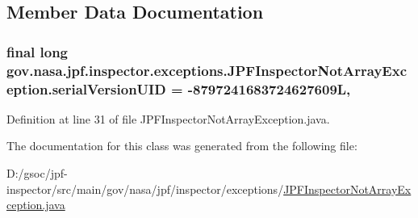 \subsection{Member Data Documentation}
\subsubsection[{\texorpdfstring{serial\+Version\+U\+ID}{serialVersionUID}}]{\setlength{\rightskip}{0pt plus 5cm}final long gov.\+nasa.\+jpf.\+inspector.\+exceptions.\+J\+P\+F\+Inspector\+Not\+Array\+Exception.\+serial\+Version\+U\+ID = -\/8797241683724627609L\hspace{0.3cm}{\ttfamily [static]}, {\ttfamily [private]}}\hypertarget{classgov_1_1nasa_1_1jpf_1_1inspector_1_1exceptions_1_1_j_p_f_inspector_not_array_exception_a85562b71ee21f8c15dd4a736f71aaf60}{}\label{classgov_1_1nasa_1_1jpf_1_1inspector_1_1exceptions_1_1_j_p_f_inspector_not_array_exception_a85562b71ee21f8c15dd4a736f71aaf60}


Definition at line 31 of file J\+P\+F\+Inspector\+Not\+Array\+Exception.\+java.



The documentation for this class was generated from the following file\+:\begin{DoxyCompactItemize}
\item 
D\+:/gsoc/jpf-\/inspector/src/main/gov/nasa/jpf/inspector/exceptions/\hyperlink{_j_p_f_inspector_not_array_exception_8java}{J\+P\+F\+Inspector\+Not\+Array\+Exception.\+java}\end{DoxyCompactItemize}
